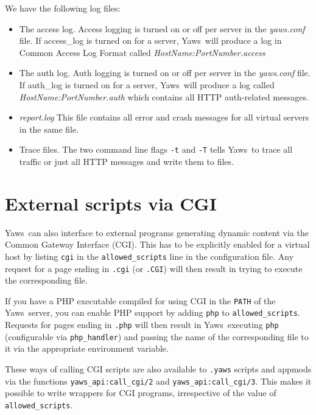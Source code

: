 \documentclass[11pt,oneside,english]{book}
\newcommand{\Yaws}            %
        {{\sc Yaws}}
\begin{document}
We have the following log files:

\begin{itemize}
\item The access log. Access logging is turned on or off per server in
  the \textit{yaws.conf} file. If access\_log is turned on for a
  server, \Yaws\ will produce a log in Common Access Log Format called
  \textit{HostName:PortNumber.access}

\item The auth log. Auth logging is turned on or off per server in the
  \textit{yaws.conf} file. If auth\_log is turned on for a server,
  \Yaws\ will produce a log called \textit{HostName:PortNumber.auth}
  which contains all HTTP auth-related messages.

\item \textit{report.log} This file contains all error and crash
  messages for all virtual servers in the same file.

\item Trace files. The two command line flags \verb+-t+ and \verb+-T+ tells
\Yaws\ to trace all traffic or just all HTTP messages and write them to files.
\end{itemize}


\chapter{External scripts via CGI}

\Yaws\  can also interface to external programs generating dynamic
content via the Common Gateway Interface (CGI).  This has to be
explicitly enabled for a virtual host by listing \verb+cgi+ in the
\verb+allowed_scripts+ line in the configuration file.  Any request
for a page ending in \verb+.cgi+ (or \verb+.CGI+) will then result in
trying to execute the corresponding file.

If you have a PHP executable compiled for using CGI in the \verb+PATH+
of the \Yaws\  server, you can enable PHP support by adding \verb+php+ to
\verb+allowed_scripts+.  Requests for pages ending in \verb+.php+ will
then result in \Yaws\  executing \verb+php+ (configurable via
\verb+php_handler+) and passing the name of the corresponding file to
it via the appropriate environment variable.

These ways of calling CGI scripts are also available to \verb+.yaws+
scripts and appmods via the functions \verb+yaws_api:call_cgi/2+ and
\verb+yaws_api:call_cgi/3+.  This makes it possible to write wrappers
for CGI programs, irrespective of the value of \verb+allowed_scripts+.
\end{document}
